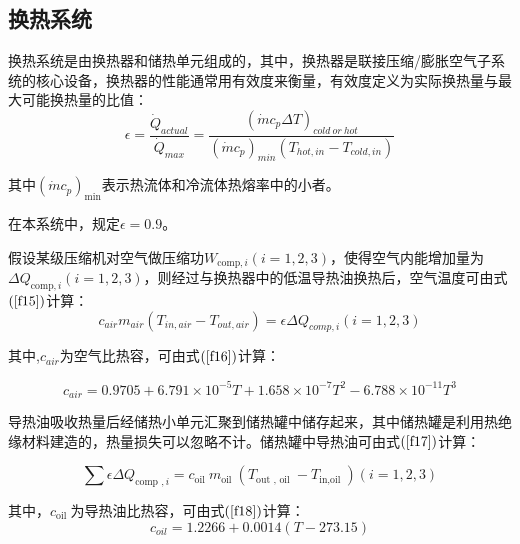 \documentclass{jnuthesis}
\begin{document}
	
	\subsection{换热系统}
	
	换热系统是由换热器和储热单元组成的，其中，换热器是联接压缩/膨胀空气子系统的核心设备，换热器的性能通常用有效度来衡量，有效度定义为实际换热量与最大可能换热量的比值：\\
	
	\begin{equation}\label{f14}
		\epsilon=\frac{\dot{Q}_{actual}}{\dot{Q}_{max}}=\frac{(\dot{m}c_p\Delta T)_{cold \  or \  hot}}{(\dot{m}c_p)_{min}(T_{hot,in}-T_{cold,in})}
	\end{equation}
	
	其中$ \left(\dot{m}{c_{p}}\right)_{\min } $表示热流体和冷流体热熔率中的小者。
	\par 在本系统中，规定$ \epsilon=0.9 $。
	\par 假设某级压缩机对空气做压缩功$ W_{\text {comp},i}(i=1,2,3) $，使得空气内能增加量为$ \Delta Q_{\text {comp}, i}(i=1,2,3) $，则经过与换热器中的低温导热油换热后，空气温度可由式$ (\fontsize{10.5bp}{10pt}\ref{f15}) $计算：
	\begin{equation}\label{f15}
		c_{a i r} m_{a i r}\left(T_{i n, a i r}-T_{o u t, a i r}\right)=\epsilon \Delta Q_{c o m p, i}(i=1,2,3)
	\end{equation}
	
	其中,$ c_{a i r} $为空气比热容，可由式$ (\fontsize{10.5bp}{10pt}\ref{f16}) $计算：
	
	\begin{equation}\label{f16}
		c_{a i r}=0.9705+6.791 \times 10^{-5} T+1.658 \times 10^{-7} T^{2}-6.788 \times 10^{-11} T^{3}
	\end{equation}
	
	导热油吸收热量后经储热小单元汇聚到储热罐中储存起来，其中储热罐是利用热绝缘材料建造的，热量损失可以忽略不计。储热罐中导热油可由式$ (\fontsize{10.5bp}{10pt}\ref{f17}) $计算：
	
	\begin{equation}\label{f17}
		\sum \epsilon \Delta Q_{\text {comp },i}=c_{\text {oil }} m_{\text {oil }}\left(T_{\text {out }, \text { oil }}-T_{\text {in,oil }}\right)(i=1,2,3)
	\end{equation}
	
	其中，$ c_{\text {oil }} $为导热油比热容，可由式$ (\fontsize{10.5bp}{10pt}\ref{f18}) $计算：
	\begin{equation}\label{f18}
		c_{o i l}=1.2266+0.0014(T-273.15)
	\end{equation}
	
\end{document}
